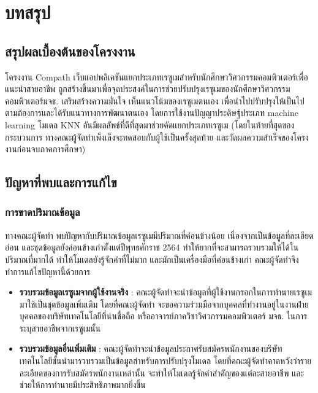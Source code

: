 \chapter{บทสรุป}

\section{สรุปผลเบื้องต้นของโครงงาน}
\par{
    โครงงาน Compath เว็บแอปพลิเคชันแยกประเภทเรซูเมสำหรับนักศึกษาวิศวกรรมคอมพิวเตอร์เพื่อแนะนำสายอาชีพ
    ถูกสร้างขึ้นมาเพื่อจุดประสงค์ในการช่วยปรับปรุงเรซูเมของนักศึกษาวิศวกรรมคอมพิวเตอร์มจธ. เสริมสร้างความมั่นใจ เห็นแนวโน้มของเรซูเมตนเอง เพื่อนำไปปรับปรุงให้เป็นไปตามต้องการและได้รับแนวทางการพัฒนาตนเอง
    โดยการใช้งานปัญญาประดิษฐ์ประเภท machine learning โมเดล KNN อันมีผลลัพธ์ที่ดีที่สุดมาช่วยคัดแยกประเภทเรซูเม (โดยในท้ายที่สุดของกระบวนการ ทางคณะผู้จัดทำเพ็งเล็งจะทดสอบกับผู้ใช้เป็นครั้งสุดท้าย และวัดผลความสำเร็จของโครงงานก่อนจบภาคการศึกษา)
}

\section{ปัญหาที่พบและการแก้ไข}
\subsection{การขาดปริมาณข้อมูล}
ทางคณะผู้จัดทำ พบปัญหากับปริมาณข้อมูลเรซูเมมีปริมาณที่ค่อนข้างน้อย\cite{dataset} 
เนื่องจากเป็นข้อมูลที่ละเอียดอ่อน และชุดข้อมูลยังค่อนข้างเก่าตั้งแต่ปีพุทธศักราช 2564 ทำให้ยากที่จะสามารถรวบรวมให้ได้ในปริมาณที่มากได้ ทำให้โมเดลยังรู้จักคำที่ไม่มาก และมักเป็นเครื่องมือที่ค่อนข้างเก่า
คณะผู้จัดทำจึงทำการแก้ไขปัญหานี้ด้วยการ
\begin{itemize}
    \item \textbf{รวบรวมข้อมูลเรซูเมจากผู้ใช้งานจริง} : คณะผู้จัดทำจะนำข้อมูลที่ผู้ใช้งานกรอกในการทำนายเรซูเมมาใช้เป็นชุดข้อมูลเพิ่มเติม โดยที่คณะผู้จัดทำ
จะขอความร่วมมือจากบุคคลที่ทำงานอยู่ในงานฝ่ายบุคคลของบริษัทเทคโนโลยีที่น่าเชื่อถือ หรืออาจารย์ภาควิชาวิศวกรรมคอมพิวเตอร์ มจธ. ในการระบุสายอาชีพจากเรซูเมนั้น
    \item \textbf{รวบรวมข้อมูลอื่นเพิ่มเติม} : คณะผู้จัดทำจะนำข้อมูลประกาศรับสมัครพนักงานของบริษัทเทคโนโลยีชั้นนำมารวบรวมเป็นข้อมูลสำหรับการปรับปรุงโมเดล
โดยที่คณะผู้จัดทำคาดหวังว่ารายละเอียดของการรับสมัครพนักงานเหล่านั้น จะทำให้โมเดลรู้จักคำสำคัญของแต่ละสายอาชีพ และช่วยให้การทำนายมีประสิทธิภาพมากยิ่งขึ้น
\end{itemize}
